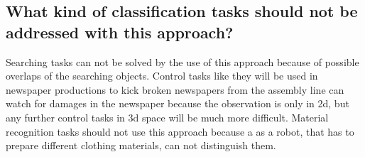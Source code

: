 \documentclass[a4paper,headings=small]{scrartcl}
\numberwithin{equation}{section} %
\numberwithin{figure}{section}   %
\begin{document}
\subsection{What kind of classification tasks should not be addressed with
this approach?}

Searching tasks can not be solved by the use of this approach because of possible overlaps
of the searching objects.
Control tasks like they will be used in newspaper productions to kick broken newspapers from
the assembly line can watch for damages in the newspaper because the observation is only in 2d,
but any further control tasks in 3d space will be much more difficult.
Material recognition tasks should not use this approach 
because a as a robot, that has to prepare different clothing materials, can not distinguish them.
\end{document}
